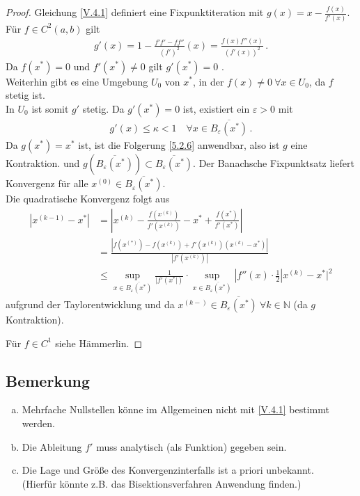 \documentclass[ngerman,fontsize=11pt, paper=a4, parskip=half, titlepage=true, toc=bib]{scrbook}
\newcommand{\N}{\mathds{N}}
\begin{document}
	\begin{proof}
	Gleichung \eqref{V.4.1} definiert eine Fixpunktiteration mit $g(x) = x-\frac{f(x)}{f'(x)}$.\\
	Für $f\in C^2(a,b)$ gilt 
	\begin{gather*}
		g'(x) = 1- \frac{f'f'-ff''}{(f')^2}(x)= \frac{f(x)f''(x)}{(f'(x))^2}\, .
	\end{gather*}
	Da $f(x^{*})= 0$ und $f'(x^{*})\neq 0$ gilt $g'(x^{*})=0$ .\\
	Weiterhin gibt es eine Umgebung $U_0$ von $x^{*}$, in der $f(x)\neq 0~\forall x\in U_0$,
	da $f$ stetig ist.\\
	In $U_0$ ist somit $g' $ stetig. Da $g'(x^{*})=0$ ist, existiert ein $\varepsilon>0$ mit
	\begin{gather*}
		g'(x)\leq \kappa<1 \quad \forall x\in \overline{B_\varepsilon(x^{*})}\, .
	\end{gather*}
	Da $g(x^{*})=x^{*}$ ist, ist die Folgerung \ref{5.2.6} anwendbar,
	also ist $g$ eine Kontraktion. und $g(\overline{B_\varepsilon(x^{*})}) \subset \overline{B_\varepsilon(x^{*})}$.
	Der Banachsche Fixpunktsatz liefert Konvergenz für alle $x^{(0)}\in\overline{B_\varepsilon(x^{*})}$. \\
	
	Die quadratische Konvergenz folgt aus 
	\begin{align*}
		|x^{(k-1)}-x^{*}| &= |x^{(k)}-\frac{f(x^{(k)})}{f'(x^{(k)})}-x^{*}+\frac{f(x^{*})}{f'(x^{*})}| \\
		&= \frac{|f(x^{(*)})-f(x^{(k)})+f'(x^{(k)})(x^{(k)}-x^{*})|}{|f'(x^{(k)})|}\\
		&\leq \sup_{x\in\overline{B_\varepsilon(x^{*})}}\frac{1}{|f'(x^{*}|)}
		\cdot \sup_{x\in\overline{B_\varepsilon(x^{*})}}|f''(x)\cdot\frac{1}{2}|x^{(k)}-x^{*}|^2
	\end{align*}
	aufgrund der Taylorentwicklung und da
	 $x^{(k-)}\in\overline{B_\varepsilon(x^{*})}~\forall k\in\N$ (da $g$ Kontraktion).
	 
	 Für $f\in C^1$ siehe Hämmerlin\cite{haemmerlinhoffmann}.
	\end{proof}
	
	\subsection{Bemerkung}
	\begin{enumerate}[a)]
		\item Mehrfache Nullstellen könne im Allgemeinen
				nicht mit \eqref{V.4.1} bestimmt werden.
		\item Die Ableitung $f'$ muss analytisch (als Funktion) gegeben sein.
		\item Die Lage und Größe des Konvergenzinterfalls ist a priori unbekannt.\\
				(Hierfür könnte z.B. das Bisektionsverfahren Anwendung finden.)
	\end{enumerate}
		
\end{document}
